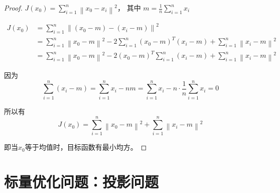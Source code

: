 \begin{proof}
    $ J\left(x_{0}\right)=\sum_{i=1}^{n}\left\|x_{0}-x_{i}\right\|^{2} ， $ 其中 $ m=\frac{1}{n} \sum_{i=1}^{n} x_{i} $

    \begin{equation}\begin{aligned}
        J\left(x_{0}\right)&=\sum_{i=1}^{n}\left\|\left(x_{0}-m\right)-\left(x_{i}-m\right)\right\|^{2} \\
        &=\sum_{i=1}^{n}\left\|x_{0}-m\right\|^{2}-2 \sum_{i=1}^{n}\left(x_{0}-m\right)^{T}\left(x_{i}-m\right)+\sum_{i=1}^{n}\left\|x_{i}-m\right\|^{2} \\
        &= \sum_{i=1}^{n}\left\|x_{0}-m\right\|^{2}-2\left(x_{0}-m\right)^{T} \sum_{i=1}^{n}\left(x_{i}-m\right)+\sum_{i=1}^{n}\left\|x_{i}-m\right\|^{2}
    \end{aligned}\end{equation}


因为
\begin{equation} \sum_{i=1}^{n}\left(x_{i}-m\right)=\sum_{i=1}^{n} x_{i}-n m=\sum_{i=1}^{n} x_{i}-n \cdot \frac{1}{n} \sum_{i=1}^{n} x_{i}=0 \end{equation}

所以有 \begin{equation} J\left(x_{0}\right)=\sum_{i=1}^{n}\left\|x_{0}-m\right\|^{2}+\sum_{i=1}^{n}\left\|x_{i}-m\right\|^{2} \end{equation}

即当$x_0$等于均值时，目标函数有最小均方。
\end{proof}

\section{标量优化问题：投影问题}

